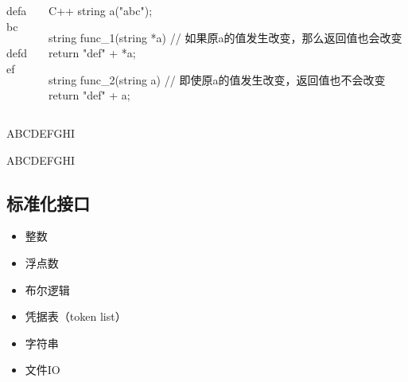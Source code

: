 \documentclass[aspectratio=169]{beamer}
\begin{document}
\begin{frame}[fragile]
\begin{columns}

\begin{column}{0.5\linewidth}

\begin{texcode*}
\newcommand{\testcmda}{abc}
\newcommand{\testcmdb}{def\testcmda}
\par\testcmdb
\renewcommand{\testcmda}{def}
\par\testcmdb
\end{texcode*}

\end{column}

\begin{column}{0.5\linewidth}

\begin{progcode}{C++}
string a("abc");

string func_1(string *a){
    // 如果原a的值发生改变，那么返回值也会改变
    return "def" + *a;
}

string func_2(string a){
    // 即使原a的值发生改变，返回值也不会改变
    return "def" + a;
}
\end{progcode}

\end{column}

\end{columns}

\end{frame}


\begin{frame}[fragile]

\begin{texcode*}
\par\uppercase{abcdefghi}
\newcommand{\testcmda}{def}
\par\uppercase{abc\testcmda ghi}
\end{texcode*}

\end{frame}


\subsection{标准化接口}

\begin{frame}[fragile]
\begin{itemize}
\item 整数
\item 浮点数
\item 布尔逻辑
\item 凭据表（token list）
\item 字符串
\item 文件IO
\end{itemize}
\end{frame}
\end{document}
